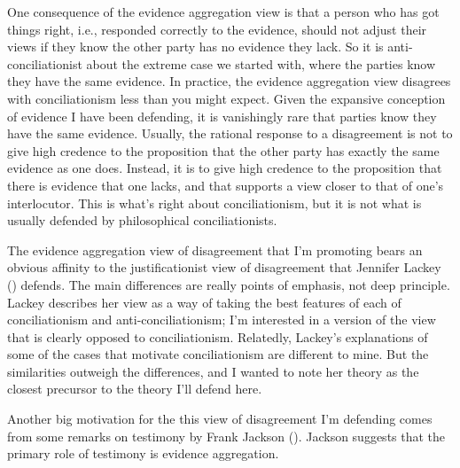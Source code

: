 \documentclass[
  10pt,
  letterpaper,
  twoside]{scrbook}
\begin{document}
One consequence of the evidence aggregation view is that a person who
has got things right, i.e., responded correctly to the evidence, should
not adjust their views if they know the other party has no evidence they
lack. So it is anti-conciliationist about the extreme case we started
with, where the parties know they have the same evidence. In practice,
the evidence aggregation view disagrees with conciliationism less than
you might expect. Given the expansive conception of evidence I have been
defending, it is vanishingly rare that parties know they have the same
evidence. Usually, the rational response to a disagreement is not to
give high credence to the proposition that the other party has exactly
the same evidence as one does. Instead, it is to give high credence to
the proposition that there is evidence that one lacks, and that supports
a view closer to that of one's interlocutor. This is what's right about
conciliationism, but it is not what is usually defended by philosophical
conciliationists.

The evidence aggregation view of disagreement that I'm promoting bears
an obvious affinity to the justificationist view of disagreement that
Jennifer Lackey () defends. The main
differences are really points of emphasis, not deep principle. Lackey
describes her view as a way of taking the best features of each of
conciliationism and anti-conciliationism; I'm interested in a version of
the view that is clearly opposed to conciliationism. Relatedly, Lackey's
explanations of some of the cases that motivate conciliationism are
different to mine. But the similarities outweigh the differences, and I
wanted to note her theory as the closest precursor to the theory I'll
defend here.

Another big motivation for the this view of disagreement I'm defending
comes from some remarks on testimony by {Frank} Jackson
(). Jackson suggests that the primary
role of testimony is evidence aggregation.
\end{document}
